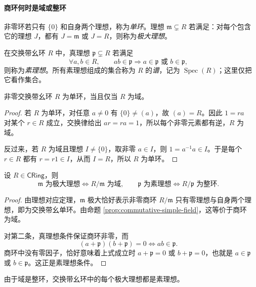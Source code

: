 \documentclass[lang=cn,a4paper,fontset=none,zihao=false,10pt,openany,twoside]{beautybook}
\numberwithin{algorithm}{chapter}
\begin{document}
\paragraph{商环何时是域或整环}
\begin{definition}[单环、极大理想与素理想]
非零环若只有 $\{0\}$ 和自身两个理想，称为\emph{单环}。理想 $\mathfrak m\subsetneq R$ 若满足：对每个包含它的理想 $J$，都有 $J=\mathfrak m$ 或 $J=R$，则称为\emph{极大理想}。

在交换带幺环 $R$ 中，真理想 $\mathfrak p\subsetneq R$ 若满足
\[
 \forall a,b\in R,\qquad ab\in\mathfrak p
 \Longrightarrow a\in\mathfrak p\text{ 或 }b\in\mathfrak p,
\]
则称为\emph{素理想}。所有素理想组成的集合称为 $R$ 的\emph{谱}，记为 $\operatorname{Spec}(R)$；这里仅把它看作集合。
\end{definition}
\begin{proposition}[交换单环就是域]\label{prop:commutative-simple-field}
非零交换带幺环 $R$ 为单环，当且仅当 $R$ 为域。
\end{proposition}
\begin{proof}
若 $R$ 为单环，对任意 $a\ne0$ 有 $\{0\}\ne(a)$，故 $(a)=R$。因此 $1=ra$ 对某个 $r\in R$ 成立，交换律给出 $ar=ra=1$，所以每个非零元素都有逆，$R$ 为域。

反过来，若 $R$ 为域且理想 $I\ne\{0\}$，取非零 $a\in I$，则 $1=a^{-1}a\in I$。于是每个 $r\in R$ 都有 $r=r1\in I$，从而 $I=R$，所以 $R$ 为单环。
\end{proof}
\begin{theorem}[用商环刻画极大理想与素理想]\label{thm:quotient-field-domain}
设 $R\in\mathsf{CRing}$，则
\[
 \mathfrak m\text{ 为极大理想}\Longleftrightarrow R/\mathfrak m\text{ 为域},
 \qquad
 \mathfrak p\text{ 为素理想}\Longleftrightarrow R/\mathfrak p\text{ 为整环}.
\]
\end{theorem}
\begin{proof}
由理想对应定理，$\mathfrak m$ 极大恰好表示非零商环 $R/\mathfrak m$ 只有零理想与自身两个理想，即为交换带幺单环。由命题 \ref{prop:commutative-simple-field}，这等价于商环为域。

对第二条，真理想条件保证商环非零，而
\[
 (a+\mathfrak p)(b+\mathfrak p)=0
 \Longleftrightarrow ab\in\mathfrak p.
\]
商环中没有零因子，恰好意味着上式成立时 $a+\mathfrak p=0$ 或 $b+\mathfrak p=0$，也就是 $a\in\mathfrak p$ 或 $b\in\mathfrak p$。这正是素理想条件。
\end{proof}
由于域是整环，交换带幺环中的每个极大理想都是素理想。
\end{document}
